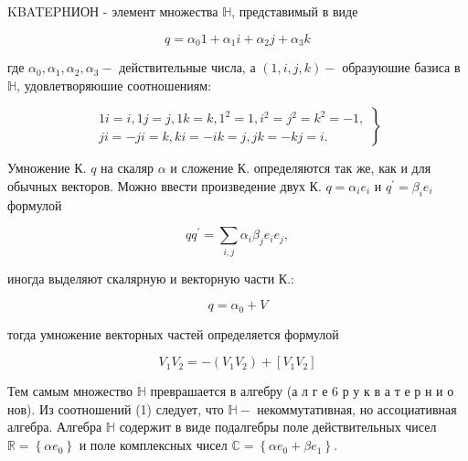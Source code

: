 \documentclass[10pt]{article}
\begin{document}
KBATEPHИОН - элемент множества $\mathbb{H}$, представимый в виде



\[

q=\alpha_{0} 1+\alpha_{1} i+\alpha_{2} j+\alpha_{3} k

\]



где $\alpha_{0}, \alpha_{1}, \alpha_{2}, \alpha_{3}-$ действительные числа, а $(1, i, j, k)-$ образуюшие базиса в $\mathbb{H}$, удовлетворяюшие соотношениям:



\[

\left.\begin{array}{c}

1 i=i, 1 j=j, 1 k=k, 1^{2}=1, i^{2}=j^{2}=k^{2}=-1, \\

j i=-j i=k, k i=-i k=j, j k=-k j=i .

\end{array}\right\}

\]



Умножение К. $q$ на скаляр $\alpha$ и сложение К. определяются так же, как и для обычных векторов. Можно ввести произведение двух К. $q=\alpha_{i} e_{i}$ и $q^{\prime}=\beta_{i} e_{i}$ формулой



\[

q q^{\prime}=\sum_{i, j} \alpha_{i} \beta_{j} e_{i} e_{j},

\]



иногда выделяют скалярную и векторную части К.:



\[

q=\alpha_{0}+V

\]



тогда умножение векторных частей определяется формулой



\[

V_{1} V_{2}=-\left(V_{1} V_{2}\right)+\left[V_{1} V_{2}\right]

\]



Тем самым множество $\mathbb{H}$ преврашается в алгебру (а л г е 6 р у к в а т е р н и о нов). Из соотношений (1) следует, что $\mathbb{H}-$ некоммутативная, но ассоциативная алгебра. Алгебра $\mathbb{H}$ содержит в виде подалгебры поле действительных чисел $\mathbb{R}=\left\{\alpha e_{0}\right\}$ и поле комплексных чисел $\mathbb{C}=\left\{\alpha e_{0}+\beta e_{1}\right\}$.
\end{document}

